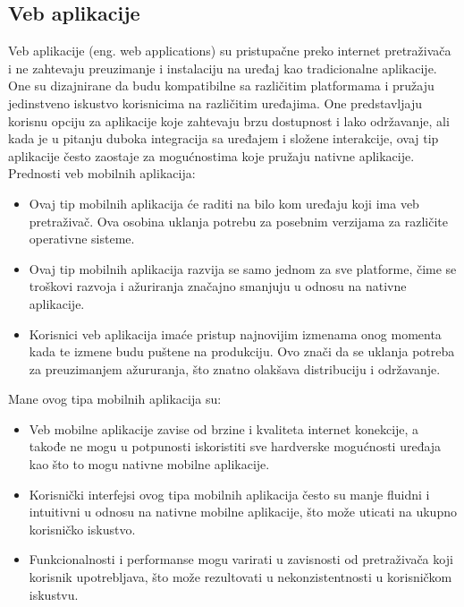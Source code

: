 \documentclass[12pt,oneside]{memoir}
\begin{document}
\subsection{Veb aplikacije}

Veb aplikacije (eng. web applications) su pristupačne preko internet pretraživača i ne zahtevaju preuzimanje i instalaciju na uređaj kao tradicionalne aplikacije. One su dizajnirane da budu kompatibilne sa različitim platformama i pružaju jedinstveno iskustvo korisnicima na različitim uređajima. One predstavljaju korisnu opciju za aplikacije koje zahtevaju brzu dostupnost i lako održavanje, ali kada je u pitanju duboka integracija sa uređajem i složene interakcije, ovaj tip aplikacije često zaostaje za mogućnostima koje pružaju nativne aplikacije. Prednosti veb mobilnih aplikacija:

\begin{itemize}
    \item Ovaj tip mobilnih aplikacija će raditi na bilo kom uređaju koji ima veb pretraživač. Ova osobina uklanja potrebu za posebnim verzijama za različite operativne sisteme.
    \item Ovaj tip mobilnih aplikacija razvija se samo jednom za sve platforme, čime se troškovi razvoja i ažuriranja značajno smanjuju u odnosu na nativne aplikacije.
    \item Korisnici veb aplikacija imaće pristup najnovijim izmenama onog momenta kada te izmene budu puštene na produkciju. Ovo znači da se uklanja potreba za preuzimanjem ažururanja, što znatno olakšava distribuciju i održavanje.
\end{itemize}
Mane ovog tipa mobilnih aplikacija su:
\begin{itemize}
    \item Veb mobilne aplikacije zavise od brzine i kvaliteta internet konekcije, a takođe ne mogu u potpunosti iskoristiti sve hardverske mogućnosti uređaja kao što to mogu nativne mobilne aplikacije.
    \item Korisnički interfejsi ovog tipa mobilnih aplikacija često su manje fluidni i intuitivni u odnosu na nativne mobilne aplikacije, što može uticati na ukupno korisničko iskustvo.
    \item Funkcionalnosti i performanse mogu varirati u zavisnosti od pretraživača koji korisnik upotrebljava, što može rezultovati u nekonzistentnosti u korisničkom iskustvu.
\end{itemize}
\end{document}

